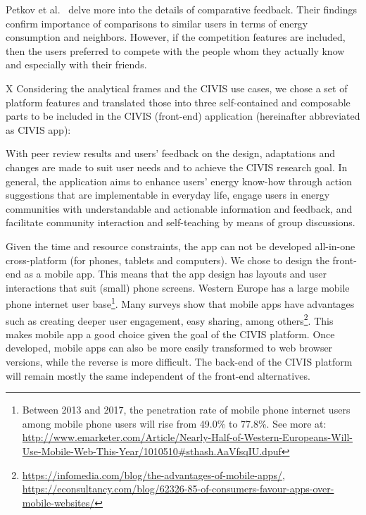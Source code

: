 Petkov et al.~\cite{petkov2011motivating} delve more into the details of comparative feedback. Their findings confirm importance of comparisons to similar users in terms of energy consumption and neighbors. However, if the competition features are included, then the users preferred to compete with the people whom they actually know and especially with their friends. 

X Considering the analytical frames and the CIVIS use cases, we chose a set of platform features and translated those into three self-contained and composable parts to be included in the CIVIS (front-end) application (hereinafter abbreviated as CIVIS app): 



With peer review results and users' feedback on the design, adaptations and changes are made to suit user needs and to achieve the CIVIS research goal. 
In general, the application aims to enhance users' energy know-how through action suggestions that are implementable in everyday life, engage users in energy communities with understandable and actionable information and feedback, and facilitate community interaction and self-teaching by means of group discussions.
%

Given the time and resource constraints, the app can not be developed all-in-one cross-platform (for phones, tablets and computers). We chose to design the front-end as a mobile app. This means that the app design has layouts and user interactions that suit (small) phone screens. %
Western Europe has a large mobile phone internet user base\footnote{
Between 2013 and 2017, the penetration rate of mobile phone internet users among mobile phone users will rise from 49.0\% to 77.8\%. See more at:\url{ http://www.emarketer.com/Article/Nearly-Half-of-Western-Europeans-Will-Use-Mobile-Web-This-Year/1010510\#sthash.AaVfsqIU.dpuf}}. Many surveys show that mobile apps have advantages such as creating deeper user engagement, easy sharing, among others\footnote{\url{https://infomedia.com/blog/the-advantages-of-mobile-apps/}, \url{https://econsultancy.com/blog/62326-85-of-consumers-favour-apps-over-mobile-websites/}}. This makes mobile app a good choice given the goal of the CIVIS platform. Once developed, mobile apps can also be more easily transformed to web browser versions, while the reverse is more difficult. The back-end of the CIVIS platform will remain mostly the same independent of the front-end alternatives. 